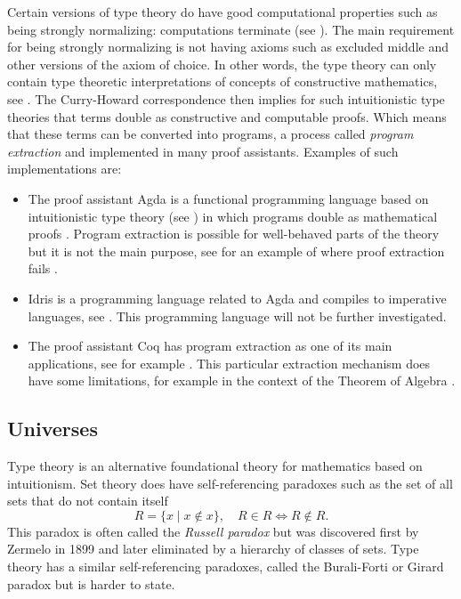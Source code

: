 \documentclass[12pt,a4paper,twoside,xetex]{book} %
\newcommand{\keyword}[1]{\emph{#1}\index{#1}}
\begin{document}
Certain versions of type theory do have good computational properties such as 
being strongly normalizing: computations terminate (see ). 
The main requirement for being strongly normalizing is not having axioms such 
as excluded middle and other versions of the axiom of choice. In other words, 
the type theory can only contain type theoretic interpretations of concepts of 
constructive mathematics, see . The Curry-Howard 
correspondence then implies for such intuitionistic type theories that terms 
double as constructive and computable proofs. Which means that these terms can 
be converted into programs, a process called \keyword{program extraction} and 
implemented in many proof assistants. Examples of such implementations are:
\begin{itemize}
\item The proof assistant Agda is a functional programming language based on 
intuitionistic type theory (see ) in which programs double as 
mathematical proofs \cite{Abel2019}. Program extraction is possible for 
well-behaved parts of the theory but it is not the main purpose, see for an example of where proof extraction fails .
\item Idris is a programming language related to Agda and compiles to imperative 
languages, see \cite{Brady2018}. This programming language will not be further investigated.
\item   The proof assistant Coq \cite{Arias2019} has program extraction as one 
of its main applications, see for example \cite{Pit-Claudel2018}. This 
particular extraction mechanism does have some limitations, for example in the 
context of the Theorem of Algebra \cite{Cruz-Filipe2005}.
\end{itemize}


\subsection{Universes}\label{universes}

Type theory is an alternative foundational theory for mathematics based on intuitionism. Set theory does have self-referencing paradoxes such as the set of all sets that do not contain itself \[ R = \{x \mid x \not \in x \}, \quad R\in R \Leftrightarrow R \not \in R. \] This paradox is often called the \keyword{Russell paradox} but was discovered first by Zermelo in 1899 and later eliminated by a hierarchy of classes of sets. Type theory has a similar self-referencing paradoxes, called the Burali-Forti or Girard paradox but is harder to state.
\end{document}
